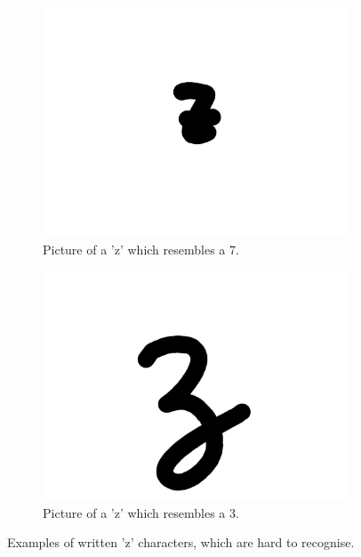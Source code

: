\documentclass{article}
\begin{document}
\begin{figure}
\begin{subfigure}{.23\textwidth}
  \centering
  \includegraphics[width=\linewidth]{images/bad_char1}
  \caption{Picture of a 'z' which resembles a 7.}
\end{subfigure}
\begin{subfigure}{.23\textwidth}
  \centering
  \includegraphics[width=\linewidth]{images/bad_char2}
  \caption{Picture of a 'z' which resembles a 3.}
\end{subfigure}
\caption{Examples of written 'z' characters, which are hard to recognise.}
\label{fig:char}
\end{figure}
\end{document}
